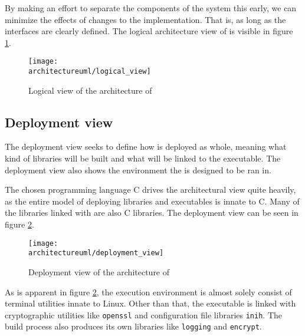 By making an effort to separate the components of the system this early, we can
minimize the effects of changes to the implementation. That is, as long as the
interfaces are clearly defined. The logical architecture view of \pman is
visible in figure \ref{dia:logical_view}.

\begin{figure}[H]
    \centering
    \centerline{\texttt{[image: \\architectureuml/logical\_view]}}
    \caption{Logical view of the architecture of \pman}
    \label{dia:logical_view}
\end{figure}

\subsection{Deployment view}

The deployment view seeks to define how \pman is deployed as whole, meaning
what kind of libraries will be built and what will be linked to the executable.
The deployment view also shows the environment the \pman is designed to be
ran in.

The chosen programming language C drives the architectural view quite heavily,
as the entire model of deploying libraries and executables is innate to C. Many
of the libraries linked with \pman are also C libraries. The deployment view
can be seen in figure \ref{dia:deployment_view}.

\begin{figure}[H]
    \centering
    \centerline{\texttt{[image: \\architectureuml/deployment\_view]}}
    \caption{Deployment view of the architecture of \pman}
    \label{dia:deployment_view}
\end{figure}

As is apparent in figure \ref{dia:deployment_view}, the execution environment
is almost solely consist of terminal utilities innate to Linux. Other than that,
the \pman executable is linked with cryptographic utilities like \texttt{openssl}
and configuration file libraries \texttt{inih}. The build process also produces
its own libraries like \texttt{logging} and \texttt{encrypt}.
